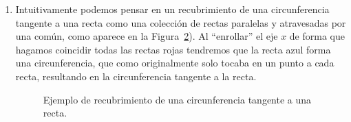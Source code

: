 \begin{ejemplo}
\begin{enumerate}
\begin{figure}[ht]
%
            \caption{Ejemplo de recubridor del toro.}
            \label{fig:recubridor_toro}
        \end{figure}%

        \item Intuitivamente podemos pensar en un recubrimiento de una circunferencia tangente a una recta como una colección de rectas paralelas y atravesadas por una común, como aparece en la Figura~\ref{fig:recubrimiento_circunferencia_tangente_recta}).  Al ``enrollar'' el eje $x$ de forma que hagamos coincidir todas las rectas rojas tendremos que la recta azul forma una circunferencia, que como originalmente solo tocaba en un punto a cada recta, resultando en la circunferencia tangente a la recta.
        
        \begin{figure}[ht]
            \centering
            \caption{Ejemplo de recubrimiento de una circunferencia tangente a una recta.}
            \label{fig:recubrimiento_circunferencia_tangente_recta}
        \end{figure}%
            

\end{enumerate}
\end{ejemplo}
